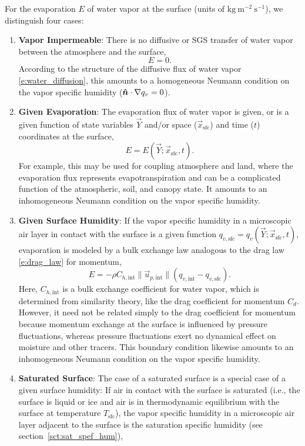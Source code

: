 \documentclass{report}
\begin{document}
For the evaporation $E$ of water vapor at the surface (units of $\mathrm{kg~m^{-2}~s^{-1}}$), we distinguish four cases:
\begin{enumerate}
    \item \textbf{Vapor Impermeable}: There is no diffusive or SGS transfer of water vapor between the atmosphere and the surface,
    \[
    E = 0.
    \]
    According to the structure of the diffusive flux of water vapor \eqref{e:water_diffusion}, this amounts to a homogeneous Neumann condition on the vapor specific humidity ($\boldsymbol{{\hat n}}\cdot\nabla q_v = 0$).
    \item \textbf{Given Evaporation}: The evaporation flux of water vapor is given, or is a given function of state variables $\vec{Y}$ and/or space ($\vec{x}_\mathrm{sfc}$) and time ($t$) coordinates at the surface,
    \[
    E = E(\vec{Y}; \vec{x}_\mathrm{sfc}, t).
    \]
    For example, this may be used for coupling atmosphere and land, where the evaporation flux represents evapotranspiration and can be a complicated function of the atmospheric, soil, and canopy state. It amounts to an inhomogeneous Neumann condition on the vapor specific humidity.
    \item \textbf{Given Surface Humidity}: If the vapor specific humidity in a microscopic air layer in contact with the surface is a given function $q_{v, \mathrm{sfc}} = q_{v}(\vec{Y}; \vec{x}_\mathrm{sfc}, t)$, evaporation is modeled by a bulk exchange law analogous to the drag law \eqref{e:drag_law} for momentum,
    \begin{equation}\label{e:sfc_evaporation}
    E = - \rho C_{h, \mathrm{int}} \| \vec{u}_{p, \mathrm{int}} \| \left( q_{v, \mathrm{int}} - q_{v, \mathrm{sfc}} \right).
    \end{equation} 
    Here, $C_{h, \mathrm{int}}$ is a bulk exchange coefficient for water vapor, which is determined from similarity theory, like the drag coefficient for momentum $C_d$. However, it need not be related simply to the drag coefficient for momentum because momentum exchange at the surface is influenced by pressure fluctuations, whereas pressure fluctuations exert no dynamical effect on moisture and other tracers. This boundary condition likewise amounts to an inhomogeneous Neumann condition on the vapor specific humidity.
    \item \textbf{Saturated Surface}: The case of a saturated surface is a special case of a given surface humidity: If air in contact with the surface is saturated (i.e., the surface is liquid or ice and air is in thermodynamic equilibrium with the surface at temperature $T_\mathrm{sfc}$), the vapor specific humidity in a microscopic air layer adjacent to the surface is the saturation specific humidity (see section~\ref{sct:sat_spef_hum}),

\end{enumerate}
\end{document}
